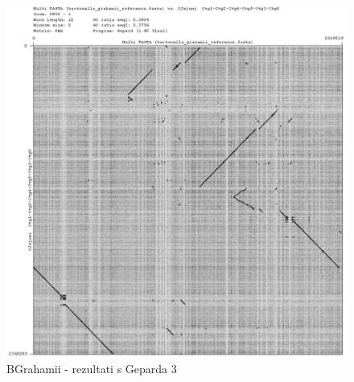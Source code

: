 \begin{figure}[H]
    \centering
    \includegraphics[scale=0.5]{img/graph14.png}
    \caption{BGrahamii - rezultati s Geparda 3}
    \label{fig:bgrahamii3}
\end{figure}